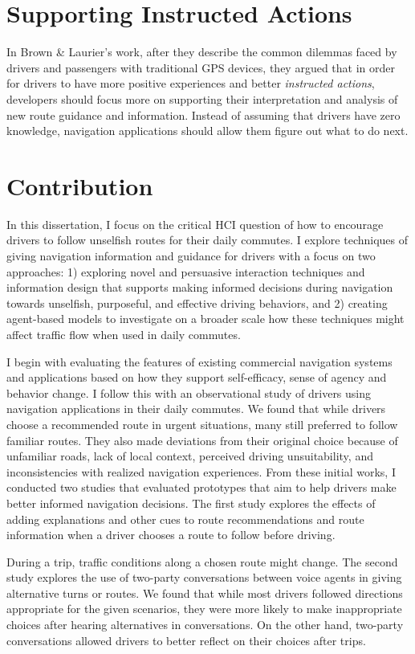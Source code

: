 \section{Supporting Instructed Actions}
In Brown \& Laurier's work\cite{Brown2012TheGPS}, after they describe the common dilemmas faced by drivers and passengers with traditional GPS devices, they argued that in order for drivers to have more positive experiences and better \textit{instructed actions}, developers should focus more on supporting their interpretation and analysis of new route guidance and information. Instead of assuming that drivers have zero knowledge, navigation applications should allow them figure out what to do next.

\section{Contribution}
In this dissertation, I focus on the critical HCI question of how to encourage drivers to follow unselfish routes for their daily commutes. I explore techniques of giving navigation information and guidance for drivers with a focus on two approaches: 1) exploring novel and persuasive interaction techniques and information design that supports making informed decisions during navigation towards unselfish, purposeful, and effective driving behaviors, and 2) creating agent-based models to investigate on a broader scale how these techniques might affect traffic flow when used in daily commutes. 

I begin with evaluating the features of existing commercial navigation systems and applications based on how they support self-efficacy, sense of agency and behavior change. I follow this with an observational study of drivers using navigation applications in their daily commutes. We found that while drivers choose a recommended route in urgent situations, many still preferred to follow familiar routes. They also made deviations from their original choice because of unfamiliar roads, lack of local context, perceived driving unsuitability, and inconsistencies with realized navigation experiences. From these initial works, I conducted two studies that evaluated prototypes that aim to help drivers make better informed navigation decisions. The first study explores the effects of adding explanations and other cues to route recommendations and route information when a driver chooses a route to follow before driving. 

During a trip, traffic conditions along a chosen route might change. The second study explores the use of two-party conversations between voice agents in giving alternative turns or routes. We found that while most drivers followed directions appropriate for the given scenarios, they were more likely to make inappropriate choices after hearing alternatives in conversations. On the other hand, two-party conversations allowed drivers to better reflect on their choices after trips.

